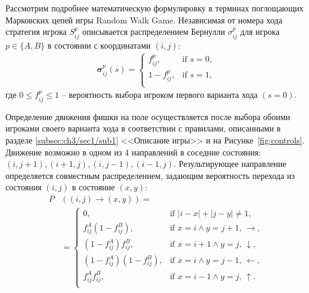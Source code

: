 Рассмотрим подробнее математическую формулировку в терминах поглощающих Марковских цепей игры Random Walk Game. Независимая от номера хода стратегия игрока $S_{ij}^p$ описывается распределением Бернулли $\sigma_{ij}^p$ для игрока $p \in \{A, B\}$ в состоянии с координатами $(i, j)$:
\begin{equation}
    \begin{aligned}
    \boldsymbol{\sigma}_{ij}^p(s)=
    \begin{cases}
        f_{ij}^p, &\mbox{if } s = 0,\\ 
        1-f_{ij}^p, &\mbox{if } s = 1,\\
    \end{cases}
    \label{eq:sigma}
    \end{aligned}
\end{equation}
где $0 \leq f_{ij}^p \leq 1$ -- вероятность выбора игроком первого варианта хода $(s=0)$.

Определение движения фишки на поле осуществляется после выбора обоими игроками своего варианта хода в соответствии с правилами, описанными в разделе \cref{subsec:ch3/sec1/sub1} <<Описание игры>> и на Рисунке~\cref{fig:controls}. Движение возможно в одном из 4 направлений в соседние состояния: $(i, j + 1), (i + 1, j), (i, j - 1), (i - 1, j)$. Результирующее направление определяется совместным распределением, задающим вероятность перехода из состояния $(i, j)$ в состояние $(x, y)$:
\begin{equation}
    \begin{aligned}
    P& \left( (i, j) \rightarrow (x, y) \right) = \\
    &=\begin{cases}
        0, &\mbox{if } |i-x|+|j-y| \neq 1,\\ 
        f_{ij}^A \left(1-f_{ij}^B\right), &\mbox{if } x=i \land y=j+1, \, \boldsymbol{\rightarrow},\\
        \left(1-f_{ij}^A\right) f_{ij}^B, &\mbox{if } x=i+1 \land y=j, \, \boldsymbol{\downarrow},\\
        \left(1-f_{ij}^A\right) \left(1-f_{ij}^B\right), &\mbox{if } x=i \land y=j-1, \, \boldsymbol{\leftarrow},\\
        f_{ij}^A f_{ij}^B, &\mbox{if } x=i-1 \land y=j, \, \boldsymbol{\uparrow}.\\
    \end{cases}
    \label{eq:transition}
    \end{aligned}
\end{equation}

